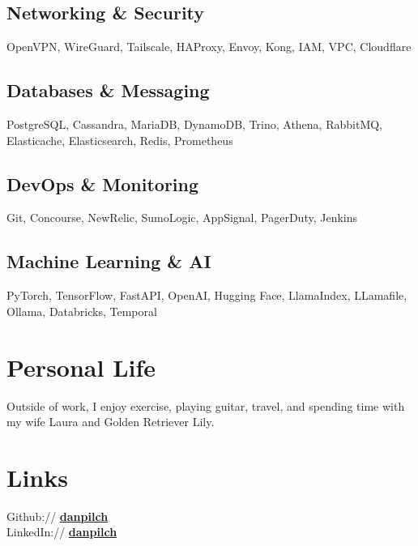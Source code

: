 \documentclass[]{resume}
\begin{document}
\begin{minipage}[t]{0.33\textwidth}
\subsection{Networking \& Security}
OpenVPN, WireGuard, Tailscale, HAProxy, Envoy, Kong, IAM, VPC, Cloudflare
\sectionsep

\subsection{Databases \& Messaging}
PostgreSQL, Cassandra, MariaDB, DynamoDB, Trino, Athena, RabbitMQ, Elasticache, Elasticsearch, Redis, Prometheus
\sectionsep

\subsection{DevOps \& Monitoring}
Git, Concourse, NewRelic, SumoLogic, AppSignal, PagerDuty, Jenkins
\sectionsep

\subsection{Machine Learning \& AI}
PyTorch, TensorFlow, FastAPI, OpenAI, Hugging Face, LlamaIndex, LLamafile, Ollama, Databricks, Temporal
\sectionsep


\section{Personal Life}
Outside of work, I enjoy exercise, playing guitar, travel, and spending time with my wife Laura and Golden Retriever Lily.
\sectionsep


\section{Links}
Github:// \href{https://github.com/danpilch}{\bf danpilch} \\
LinkedIn://  \href{https://www.linkedin.com/in/danpilch}{\bf danpilch}
\sectionsep

\end{minipage}
\end{document}
